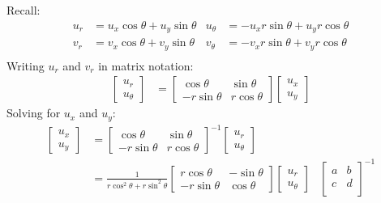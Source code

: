 \documentclass[12pt, english]{book}
\makeatletter
\renewenvironment{proof}[1][\proofname]{\par
	\pushQED{\qed}%
	\normalfont \topsep6\p@\@plus6\p@\relax
	\list{}{%
		\settowidth{\leftmargin}{\itshape\proofname:\hskip\labelsep}%
		\setlength{\labelwidth}{0pt}%
		\setlength{\itemindent}{-\leftmargin}%
		}%
	\item[\hskip\labelsep\itshape#1\@addpunct{:}]\ignorespaces
	}{\popQED\endlist\@endpefalse}
\makeatother
\begin{document}
\begin{proof}
		{\color{Grey}
			Recall:
			\begin{align*}
				u_r &= u_x \cos \theta + u_y \sin \theta 
				&	u_\theta &= -u_x r \sin \theta + u_y r \cos \theta \\
				v_r &= v_x \cos \theta + v_y \sin \theta 
				&	v_\theta &= -v_x r \sin \theta + v_y r \cos \theta \\
			\end{align*}
			Writing \(u_r\) and \(v_r\) in matrix notation: 
			\begin{align*}
				\begin{bmatrix}
					u_r \\ u_\theta
				\end{bmatrix}
				&= 
				\begin{bmatrix}
					\cos\theta & \sin\theta \\
					-r\sin\theta & r\cos\theta
				\end{bmatrix}
				\begin{bmatrix}
					u_x \\ u_y
				\end{bmatrix}
			\end{align*}
			Solving for \(u_x\) and \(u_y\):
			\begin{align*}
				\begin{bmatrix}
					u_x \\ u_y
				\end{bmatrix}
				&=
					\begin{bmatrix}
						\cos\theta & \sin\theta \\
						-r\sin\theta & r\cos\theta
					\end{bmatrix}^{-1}
					\begin{bmatrix}
						u_r \\ u_\theta
					\end{bmatrix} & \\
				&= \frac{1}{r \cos^2\theta + r \sin^2\theta}
					\begin{bmatrix}
						r\cos\theta & -\sin\theta \\
						-r\sin\theta & \cos\theta
					\end{bmatrix}
					\begin{bmatrix}
						u_r \\ u_\theta
					\end{bmatrix} 
					& \begin{bmatrix}
						a & b \\
						c & d \\
					  \end{bmatrix}^{-1}

\end{align*}}
\end{proof}
\end{document}
